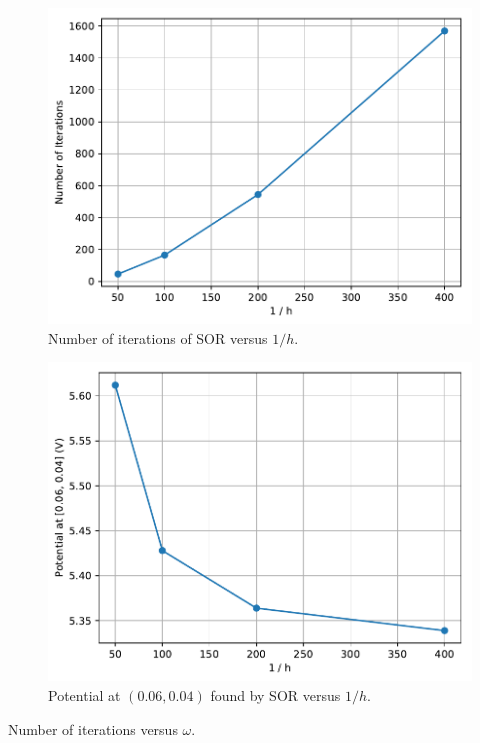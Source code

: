 \documentclass[a4paper,titlepage]{article}
\begin{document}
	\begin{figure}[!htb]
		\centering
		\includegraphics[width=\columnwidth]{plots/q3c_iterations.pdf}
		\caption
		{Number of iterations of SOR versus $1/h$.}
		\label{fig:q3c_iterations}
	\end{figure}

	\begin{figure}[!htb]
		\centering
		\includegraphics[width=\columnwidth]{plots/q3c_potential.pdf}
		\caption
		{Potential at $(0.06, 0.04)$ found by SOR versus $1/h$.}
		\label{fig:q3c_potential}
	\end{figure}

	\begin{table}[!htb]
		\centering
		\caption{Number of iterations versus $\omega$.}
		\label{tabel:q3c_iterations}
	\end{table}
	
\end{document}
